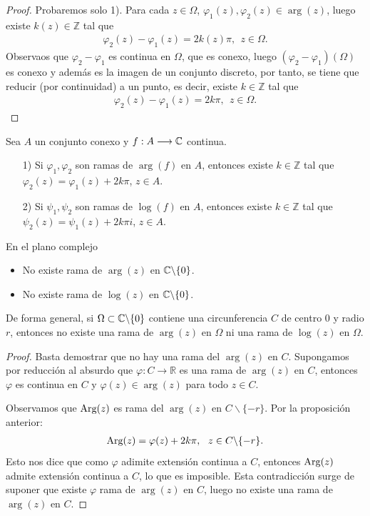 \begin{proof}
    Probaremos solo 1). Para cada $z \in \Omega$, $\varphi_1(z), \varphi_2(z) \in \arg(z)$, luego existe $k(z) \in \mathbb{Z}$ tal que
    \begin{align*}
        \varphi_2(z) - \varphi_1(z) = 2k(z)\pi, \ \ z \in \Omega.
    \end{align*}
    Observaos que $\varphi_2 - \varphi_1$ es continua en $\Omega$, que es conexo, luego $(\varphi_2 - \varphi_1)(\Omega)$ es conexo y además es la imagen de un conjunto discreto, por tanto, se tiene que reducir (por continuidad) a un punto, es decir, existe $k \in \mathbb{Z}$ tal que
    \begin{align*}
        \varphi_2(z) - \varphi_1(z) = 2k\pi, \ \ z \in \Omega.
    \end{align*}
\end{proof}

\begin{prop}
    Sea $A$ un conjunto conexo y $ f: A \longrightarrow \mathbb{C}$ continua.
    \begin{enumerate}
        \item[1)] Si $\varphi_1,\varphi_2$ son ramas de $\arg(f)$ en $A$, entonces existe $k \in \mathbb{Z}$ tal que $\varphi_2(z) = \varphi_1(z) + 2k\pi$, $z \in A$.
        \item[2)] Si $\psi_1,\psi_2$ son ramas de $\log(f)$ en $A$, entonces existe $k \in \mathbb{Z}$ tal que $\psi_2(z) = \psi_1(z) + 2k\pi i$, $z \in A$.
    \end{enumerate}
\end{prop}

\begin{prop}
    En el plano complejo
    \begin{itemize}
        \item No existe rama de $\arg(z)$ en $\mathbb{C} \backslash \{0\}$.
        \item No existe rama de $\log(z)$ en $\mathbb{C} \backslash \{0\}$.
    \end{itemize}
    De forma general, si $\Omega \subset \mathbb{C} \backslash \{0\}$ contiene una circunferencia $C$ de centro $0$ y radio $r$, entonces no existe una rama de $\arg(z)$ en $\Omega$ ni una rama de $\log(z)$ en $\Omega$.
\end{prop}

\begin{proof}
    Basta demostrar que no hay una rama del $\arg(z)$ en $C$. Supongamos por reducción al absurdo que $\varphi: C \longrightarrow \mathbb{R}$ es una rama de $\arg(z)$ en $C$, entonces $\varphi$ es continua en $C$ y $\varphi(z) \in \arg(z)$ para todo $z \in C$.

    Observamos que $\text{Arg}(z)$ es rama del $\arg(z)$ en $C \backslash \{ -r \}$. Por la proposición anterior:
    \begin{align*}
        \text{Arg}(z) = \varphi(z) + 2k\pi, \ \ z \in C \backslash \{-r\}.
    \end{align*}
    Esto nos dice que como $\varphi$ adimite extensión continua a $C$, entonces $\text{Arg}(z)$ admite extensión continua a $C$, lo que es imposible. Esta contradicción surge de suponer que existe $\varphi$ rama de $\arg(z)$ en $C$, luego no existe una rama de $\arg(z)$ en $C$.
\end{proof}

